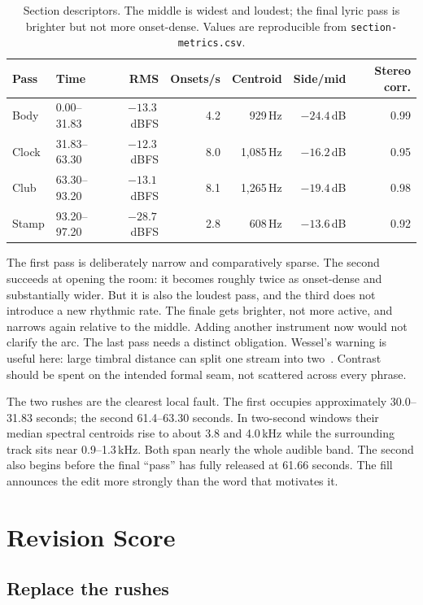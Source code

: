 \documentclass[10pt,letterpaper,twocolumn]{article}
\newcommand{\code}[1]{\nolinkurl{#1}}
\newcommand{\dbfs}{\,dBFS}
\begin{document}
\begin{table}[t]
\centering
\small
\begin{tabular}{@{}llrrrrr@{}}
\toprule
\textbf{Pass} & \textbf{Time} & \textbf{RMS} & \textbf{Onsets/s} & \textbf{Centroid} & \textbf{Side/mid} & \textbf{Stereo corr.} \\
\midrule
Body  & 0.00--31.83 & $-13.3$\dbfs & 4.2 & 929\,Hz   & $-24.4$\,dB & 0.99 \\
Clock & 31.83--63.30 & $-12.3$\dbfs & 8.0 & 1,085\,Hz & $-16.2$\,dB & 0.95 \\
Club  & 63.30--93.20 & $-13.1$\dbfs & 8.1 & 1,265\,Hz & $-19.4$\,dB & 0.98 \\
Stamp & 93.20--97.20 & $-28.7$\dbfs & 2.8 & 608\,Hz   & $-13.6$\,dB & 0.92 \\
\bottomrule
\end{tabular}
\caption{Section descriptors. The middle is widest and loudest; the final lyric pass is brighter but not more onset-dense. Values are reproducible from \code{section-metrics.csv}.}
\label{tab:passes}
\end{table}

The first pass is deliberately narrow and comparatively sparse. The second succeeds at opening the room: it becomes roughly twice as onset-dense and substantially wider. But it is also the loudest pass, and the third does not introduce a new rhythmic rate. The finale gets brighter, not more active, and narrows again relative to the middle. Adding another instrument now would not clarify the arc. The last pass needs a distinct obligation. Wessel's warning is useful here: large timbral distance can split one stream into two~\cite{wessel1979timbre}. Contrast should be spent on the intended formal seam, not scattered across every phrase.

The two rushes are the clearest local fault. The first occupies approximately 30.0--31.83 seconds; the second 61.4--63.30 seconds. In two-second windows their median spectral centroids rise to about 3.8 and 4.0\,kHz while the surrounding track sits near 0.9--1.3\,kHz. Both span nearly the whole audible band. The second also begins before the final ``pass'' has fully released at 61.66 seconds. The fill announces the edit more strongly than the word that motivates it.

\section{Revision Score}

\subsection{Replace the rushes}
\end{document}
